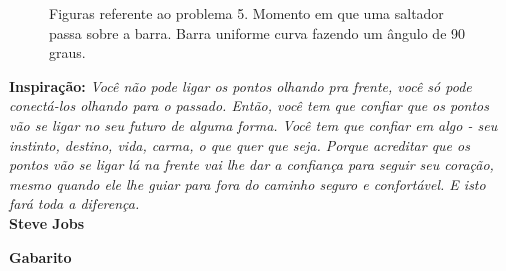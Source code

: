 \documentclass[12pt]{article}
\begin{document}
 \begin{figure}
 \centering
 \caption{Figuras referente ao problema 5.  Momento em que uma saltador passa sobre a barra.  Barra uniforme curva fazendo um ângulo de 90 graus.}
 \end{figure}
 
 \begin{flushright}
\begin{small}
\textbf{Inspiração:}
{\color{blue}\textit{Você não pode ligar os pontos olhando pra frente, você só pode conectá-los olhando para o passado. Então, você tem que confiar que os pontos vão se ligar no seu futuro de alguma forma. Você tem que confiar em algo - seu instinto, destino, vida, carma, o que quer que seja. Porque acreditar que os pontos vão se ligar lá na frente vai lhe dar a confiança para seguir seu coração, mesmo quando ele lhe guiar para fora do caminho seguro e confortável. E isto fará toda a diferença.}}  \\
\textbf{Steve Jobs}
\end{small}
\end{flushright}

\newpage

{\color{red}\textbf{Gabarito}}
\end{document}
